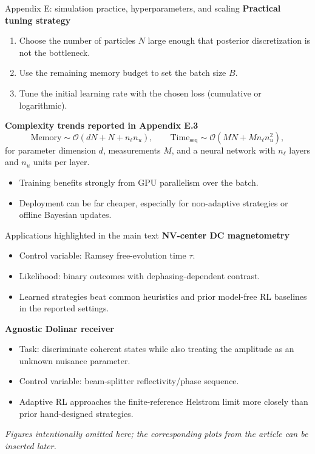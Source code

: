 \documentclass[aspectratio=169]{beamer}
\begin{document}
\begin{frame}{Appendix E: simulation practice, hyperparameters, and scaling}
\textbf{Practical tuning strategy}
\begin{enumerate}
  \item Choose the number of particles $N$ large enough that posterior discretization is not the bottleneck.
  \item Use the remaining memory budget to set the batch size $B$.
  \item Tune the initial learning rate with the chosen loss (cumulative or logarithmic).
\end{enumerate}
\vspace{0.5em}
\textbf{Complexity trends reported in Appendix E.3}
\[
  \text{Memory}\sim \mathcal O(dN+N+n_\ell n_u),
  \qquad
  \text{Time}_{\mathrm{seq}}\sim \mathcal O(MN+Mn_\ell n_u^2),
\]
for parameter dimension $d$, measurements $M$, and a neural network with $n_\ell$ layers and $n_u$ units per layer.
\begin{itemize}
  \item Training benefits strongly from GPU parallelism over the batch.
  \item Deployment can be far cheaper, especially for non-adaptive strategies or offline Bayesian updates.
\end{itemize}
\end{frame}

\begin{frame}{Applications highlighted in the main text}
\textbf{NV-center DC magnetometry}
\begin{itemize}
  \item Control variable: Ramsey free-evolution time $\tau$.
  \item Likelihood: binary outcomes with dephasing-dependent contrast.
  \item Learned strategies beat common heuristics and prior model-free RL baselines in the reported settings.
\end{itemize}
\vspace{0.5em}
\textbf{Agnostic Dolinar receiver}
\begin{itemize}
  \item Task: discriminate coherent states while also treating the amplitude as an unknown nuisance parameter.
  \item Control variable: beam-splitter reflectivity/phase sequence.
  \item Adaptive RL approaches the finite-reference Helstrom limit more closely than prior hand-designed strategies.
\end{itemize}
\vspace{0.4em}
\textit{Figures intentionally omitted here; the corresponding plots from the article can be inserted later.}
\end{frame}
\end{document}
